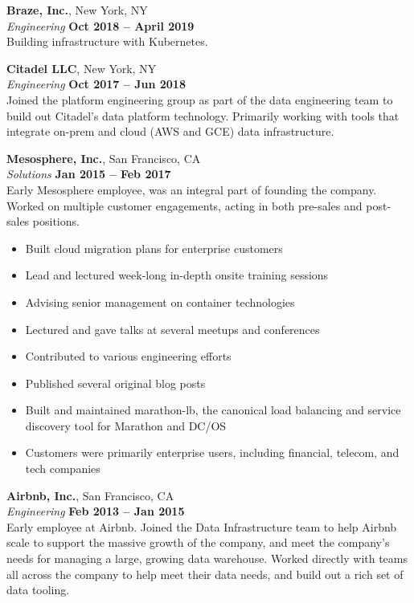 \documentclass[margin,line]{resume}
\begin{document}
\begin{resume}
    \textbf{Braze, Inc.}, New York, NY \vspace{2mm}\\\vspace{1mm}%
    \textsl{Engineering} \hfill \textbf{Oct 2018 -- April 2019}\\
    Building infrastructure with Kubernetes.

    \textbf{Citadel LLC}, New York, NY \vspace{2mm}\\\vspace{1mm}%
    \textsl{Engineering} \hfill \textbf{Oct 2017 -- Jun 2018}\\
    Joined the platform engineering group as part of the data engineering
    team to build out Citadel's data platform technology. Primarily working
    with tools that integrate on-prem and cloud (AWS and GCE) data
    infrastructure.

    \textbf{Mesosphere, Inc.}, San Francisco, CA \vspace{2mm}\\\vspace{1mm}%
    \textsl{Solutions} \hfill \textbf{Jan 2015 -- Feb 2017}\\
    Early Mesosphere employee, was an integral part of founding the company.
    Worked on multiple customer engagements, acting in both pre-sales and
    post-sales positions.

    \begin{itemize}
    \item Built cloud migration plans for enterprise customers
    \item Lead and lectured week-long in-depth onsite training sessions
    \item Advising senior management on container technologies
    \item Lectured and gave talks at several meetups and conferences
    \item Contributed to various engineering efforts
    \item Published several original blog posts
    \item Built and maintained marathon-lb, the canonical load balancing and
     service discovery tool for Marathon and DC/OS
    \item Customers were primarily enterprise users, including financial,
     telecom, and tech companies
    \end{itemize}

    \textbf{Airbnb, Inc.}, San Francisco, CA \vspace{2mm}\\\vspace{1mm}%
    \textsl{Engineering} \hfill \textbf{Feb 2013 -- Jan 2015}\\
    Early employee at Airbnb. Joined the Data Infrastructure team to help
    Airbnb scale to support the massive growth of the company, and meet the
    company's needs for managing a large, growing data warehouse. Worked
    directly with teams all across the company to help meet their data needs,
    and build out a rich set of data tooling.


\end{resume}
\end{document}
